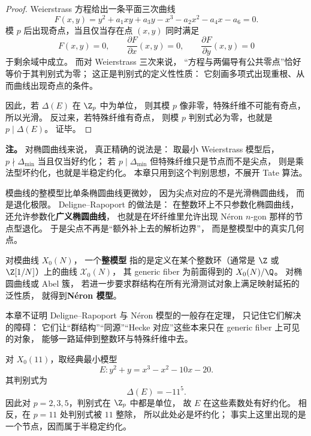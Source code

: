 \begin{proof}
Weierstrass 方程给出一条平面三次曲线
\[
  F(x,y)=y^2+a_1xy+a_3y-x^3-a_2x^2-a_4x-a_6=0.
\]
模 $p$ 后出现奇点，当且仅当存在点 $(x,y)$ 同时满足
\[
  F(x,y)=0,
  \qquad \frac{\partial F}{\partial x}(x,y)=0,
  \qquad \frac{\partial F}{\partial y}(x,y)=0
\]
于剩余域中成立。
而对 Weierstrass 三次来说，
“方程与两偏导有公共零点”恰好等价于其判别式为零；
这正是判别式的定义性性质：
它刻画多项式出现重根、从而曲线出现奇点的条件。

因此，若 $\Delta(E)$ 在 $\Z_p$ 中为单位，
则其模 $p$ 像非零，特殊纤维不可能有奇点，所以光滑。
反过来，若特殊纤维有奇点，
则模 $p$ 判别式必为零，也就是 $p\mid \Delta(E)$。
证毕。
\end{proof}

\textbf{注。}
对椭圆曲线来说，
真正精确的说法是：
取最小 Weierstrass 模型后，$p\nmid \Delta_{\min}$ 当且仅当好约化；
若 $p\mid \Delta_{\min}$ 但特殊纤维只是节点而不是尖点，
则是乘法型坏约化，也就是半稳定约化。
本章只用到这个判别思想，不展开 Tate 算法。

模曲线的整模型比单条椭圆曲线更微妙，
因为尖点对应的不是光滑椭圆曲线，
而是退化极限。
Deligne--Rapoport 的做法是：
在整数环上不只参数化椭圆曲线，
还允许参数化\textbf{广义椭圆曲线}，
也就是在坏纤维里允许出现 N\'eron $n$-gon 那样的节点型退化。
于是尖点不再是“额外补上去的解析边界”，
而是整模型中的真实几何点。

\begin{definition}
\label{def:ch07-integral-neron}
对模曲线 $X_0(N)$，
一个\textbf{整模型} 指的是定义在某个整数环（通常是 $\Z$ 或 $\Z[1/N]$）上的曲线
$\mathcal X_0(N)$，
其 generic fiber 为前面得到的 $X_0(N)/\Q$。
对椭圆曲线或 Abel 簇，
若进一步要求群结构在所有光滑测试对象上满足映射延拓的泛性质，
就得到\textbf{N\'eron 模型}。
\end{definition}

本章不证明 Deligne--Rapoport 与 N\'eron 模型的一般存在定理，
只记住它们解决的障碍：
它们让“群结构”“同源”“Hecke 对应”这些本来只在 generic fiber 上可见的对象，
能够一路延伸到整数环与特殊纤维中去。

\begin{example}[$X_0(11)$ 在小素数处的约化]
\label{ex:ch07-x011-reduction}
对 $X_0(11)$，取经典最小模型
\[
  E: y^2+y=x^3-x^2-10x-20.
\]
其判别式为
\[
  \Delta(E)=-11^5.
\]
因此对 $p=2,3,5$，判别式在 $\Z_p$ 中都是单位，
故 $E$ 在这些素数处有好约化。
相反，在 $p=11$ 处判别式被 $11$ 整除，
所以此处必是坏约化；
事实上这里出现的是一个节点，因而属于半稳定约化。
\end{example}

